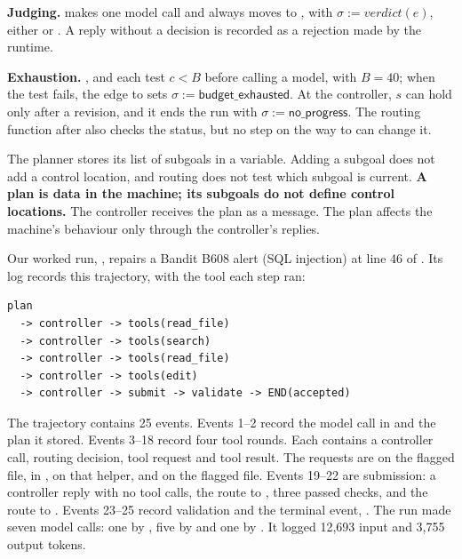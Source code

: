 \item \textbf{Judging.}  makes one model call and always moves to ,
with $\sigma := \mathit{verdict}(e)$, either  or . A reply
without a decision is recorded as a rejection made by the runtime.

\item \textbf{Exhaustion.} ,  and  each test
$c < B$ before calling a model, with $B = 40$; when the test fails, the edge to  sets
$\sigma := \mathsf{budget\_exhausted}$. At the controller, $s$ can hold only after a revision, and
it ends the run with $\sigma := \mathsf{no\_progress}$. The routing function after 
also checks the status, but no step on the way to  can change it.

\ei

The planner stores its list of subgoals in a variable. Adding a subgoal does not add a control
location, and routing does not test which subgoal is current. \textbf{A plan is data in the machine;
its subgoals do not define control locations.} The controller receives the plan as a message. The
plan affects the machine's behaviour only through the controller's replies.

Our worked run, , repairs a Bandit B608 alert (SQL injection) at line 46 of
. Its log records this trajectory, with the tool each
 step ran:

\noindent\begin{minipage}{\linewidth}
\begin{lstlisting}[basicstyle=\ttfamily\scriptsize]
plan
  -> controller -> tools(read_file)
  -> controller -> tools(search)
  -> controller -> tools(read_file)
  -> controller -> tools(edit)
  -> controller -> submit -> validate -> END(accepted)
\end{lstlisting}
\end{minipage}

The trajectory contains 25 events. Events 1--2 record the model call in  and the plan
it stored. Events 3--18 record four tool rounds. Each contains a controller call, routing decision,
tool request and tool result. The requests are  on the flagged file,
 in ,  on that helper, and
 on the flagged file. Events 19--22 are submission: a controller reply with no tool
calls, the route to , three passed checks, and the route to .
Events 23--25 record validation and the terminal event, . The run made seven
model calls: one by , five by  and one by . It
logged 12,693 input and 3,755 output tokens.


